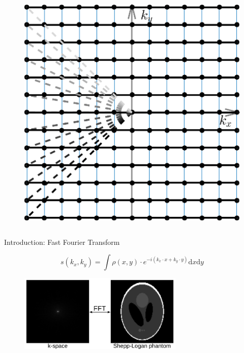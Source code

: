 \begin{frame}
\begin{columns}
		\begin{column}{0.35\textwidth}
			\begin{figure}
				\includegraphics[width=\columnwidth]{fig/mri-trj-cartes.png}
			\end{figure}
		\end{column}
	\end{columns}
\end{frame}


\begin{frame}{Introduction: Fast Fourier Transform}

	\begin{equation}
		s(k_x, k_y) = \int \rho(x, y) \cdot e^{-i (k_x \cdot x + k_y \cdot y)} \text{d}x \text{d}y
	\end{equation}

	\begin{figure}
		\includegraphics[width=0.7\textwidth]{fig/fft.png}
	\end{figure}

\end{frame}


